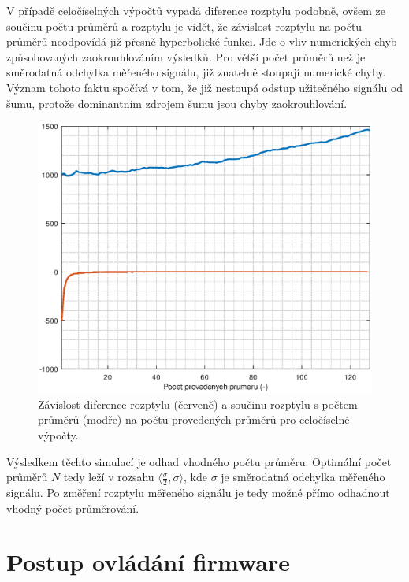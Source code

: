 V případě celočíselných výpočtů vypadá diference rozptylu podobně, ovšem ze součinu počtu průměrů a rozptylu je vidět, že závislost rozptylu na počtu průměrů neodpovídá již přesně hyperbolické funkci. Jde o vliv numerických chyb způsobovaných zaokrouhlováním výsledků. Pro větší počet průměrů než je směrodatná odchylka měřeného signálu, již znatelně stoupají numerické chyby. Význam tohoto faktu spočívá v tom, že již nestoupá odstup užitečného signálu od šumu, protože dominantním zdrojem šumu jsou chyby zaokrouhlování.

\begin{figure}[htbp]
\includegraphics[width=\textwidth,keepaspectratio]{images/averaging_integer_difference_error.eps}\caption{Závislost diference rozptylu (červeně) a součinu rozptylu s počtem průměrů (modře) na počtu provedených průměrů pro celočíselné výpočty.}\label{averaging_float_difference_error}
\end{figure}

Výsledkem těchto simulací je odhad vhodného počtu průměru. Optimální počet průměrů $N$ tedy leží v rozsahu $\langle\frac{\sigma}{2}, \sigma \rangle$, kde $\sigma$ je směrodatná odchylka měřeného signálu. Po změření rozptylu měřeného signálu je tedy možné přímo odhadnout vhodný počet průměrování.

\section{Postup ovládání firmware}

